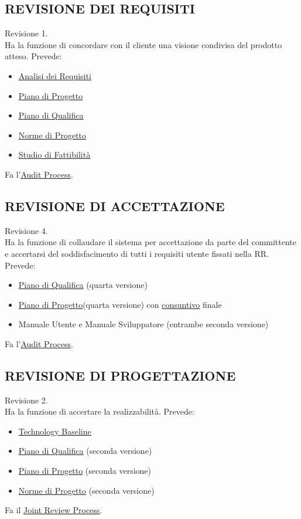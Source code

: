 		\subsection{REVISIONE DEI REQUISITI}  \label{RR}
		Revisione 1. \\
		Ha la funzione di concordare con il cliente una visione condivisa del prodotto atteso.
		Prevede:
		\begin{itemize}
			\item \underline{\hyperref[analisideirequisiti]{Analisi dei Requisiti}}
			\item \underline{\hyperref[piano]{Piano di Progetto}}
			\item \underline{\hyperref[pianoqualifica]{Piano di Qualifica}}
			\item \underline{\hyperref[norme]{Norme di Progetto}}
			\item \underline{\hyperref[studiofattibilita]{Studio di Fattibilità}}
		\end{itemize}
		Fa l'\underline{\hyperref[audit]{Audit Process}}.


		\subsection{REVISIONE DI ACCETTAZIONE}  \label{RA}
		Revisione 4. \\
		Ha la funzione di collaudare il sistema per accettazione da parte del committente e accertarsi del soddisfacimento di tutti i requisiti utente fissati nella RR.
		Prevede:
		\begin{itemize}
			\item \underline{\hyperref[pianoqualifica]{Piano di Qualifica}} (quarta versione)
			\item \underline{\hyperref[piano]{Piano di Progetto}}(quarta versione) con \underline{\hyperref[consuntivo]{consuntivo}} finale
			\item Manuale Utente e Manuale Sviluppatore (entrambe seconda versione)
		\end{itemize}
		Fa l'\underline{\hyperref[audit]{Audit Process}}.


		\subsection{REVISIONE DI PROGETTAZIONE}	 \label{RP}
		Revisione 2. \\
		Ha la funzione di accertare la realizzabilità.
		Prevede:
		\begin{itemize}
			\item \underline{\hyperref[technologybaseline]{Technology Baseline}}
			\item \underline{\hyperref[pianoqualifica]{Piano di Qualifica}} (seconda versione)
			\item \underline{\hyperref[piano]{Piano di Progetto}} (seconda versione)
			\item \underline{\hyperref[norme]{Norme di Progetto}} (seconda versione)
		\end{itemize}
		Fa il \underline{\hyperref[joint]{Joint Review Process}}.


